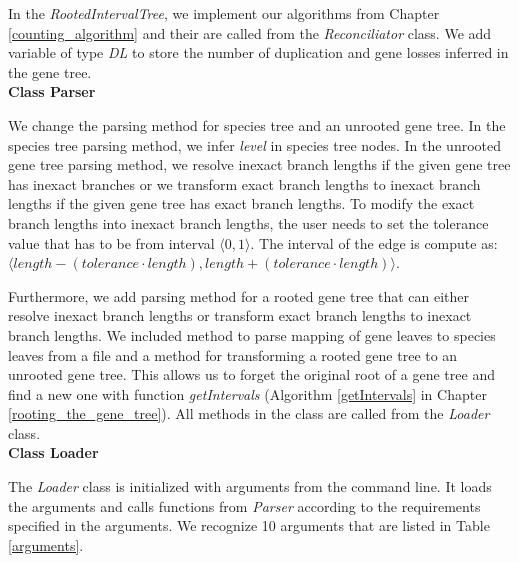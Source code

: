 In the \emph{RootedIntervalTree}, we implement our algorithms from Chapter \ref{counting_algorithm} and their are called from the \emph{Reconciliator} class. We add variable of type \emph{DL} to store the number of duplication and gene losses inferred in the gene tree.\\
\textbf{Class Parser}

We change the parsing method for species tree and an unrooted gene tree. In the species tree parsing method, we infer \emph{level} in species tree nodes. In the unrooted gene tree parsing method, we resolve inexact branch lengths if the given gene tree has inexact branches or we transform exact branch lengths to inexact branch lengths if the given gene tree has exact branch lengths. To modify the exact branch lengths into inexact branch lengths, the user needs to set the tolerance value that has to be from interval $\langle 0, 1 \rangle$. The interval of the edge is compute as: $\langle length - (tolerance \cdot length), length + (tolerance \cdot length) \rangle$.

Furthermore, we add parsing method for a rooted gene tree that can either resolve inexact branch lengths or transform exact branch lengths to inexact branch lengths. We included method to parse mapping of gene leaves to species leaves from a file and a method for transforming a rooted gene tree to an unrooted gene tree. This allows us to forget the original root of a gene tree and find a new one with function \emph{getIntervals} (Algorithm \ref{getIntervals} in Chapter \ref{rooting_the_gene_tree}). All methods in the class are called from the \emph{Loader} class.\\
\textbf{Class Loader}

The \emph{Loader} class is initialized with arguments from the command line. It loads the arguments and calls functions from \emph{Parser} according to the requirements specified in the arguments. We recognize 10 arguments that are listed in Table \ref{arguments}.

